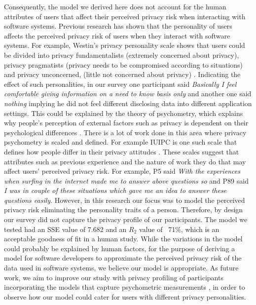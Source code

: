 \documentclass[10pt]{article}
\begin{document}
Consequently, the model we derived here does not account for the human attributes of users that affect their perceived privacy risk when interacting with software systems. Previous research has shown that the personality of users affects the perceived privacy risk of users when they interact with software systems. For example, Westin's privacy personality scale \cite {westin1991equifax} shows that users could be divided into privacy fundamentalists (extremely concerned about privacy), privacy pragmatists (privacy needs to be compromised according to situations) and privacy unconcerned, (little not concerned about privacy) \cite {westin1991equifax}. Indicating the effect of such personalities, in our survey one participant said \textit{Basically I feel comfortable giving information on a need to know basis only} and another one said \textit {nothing} implying he did not feel different disclosing data into different application settings. This could be explained by the theory of psychometry, which explains why people's perception of external factors such as privacy is dependent on their psychological differences \cite {malhotra2004internet, egelman2015predicting}. There is a lot of work done in this area where privacy psychometry is scaled and defined. For example IUIPC is one such scale that defines how people differ in their privacy attitudes \cite {malhotra2004internet}. These scales suggest that attributes such as previous experience and the nature of work they do that may affect users' perceived privacy risk. For example, P5 said \textit{With the experiences when surfing in the internet made me to answer above questions so} and P89 said \textit {I was in couple of these situations which gave me an idea to answer these questions easily}. However, in this research our focus was to model the perceived privacy risk eliminating the personality traits of a person. Therefore, by design our survey did not capture the privacy profile of our participants. The model we tested had an SSE value of 7.682 and an $R_{2}$ value of ~71\%, which is an acceptable goodness of fit in a human study. While the variations in the model could probably be explained by human factors, for the purpose of deriving a model for software developers to approximate the perceived privacy risk of the data used in software systems, we believe our model is appropriate. As future work, we aim to improve our study with privacy profiling of participants incorporating the models that capture psychometric measurements \cite {malhotra2004internet, egelman2015predicting, westin1991equifax}, in order to observe how our model could cater for users with different privacy personalities. 
\end{document}
